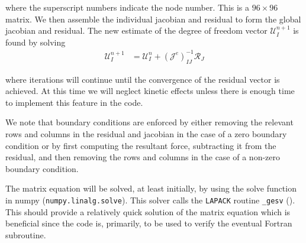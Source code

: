 where the superscript numbers indicate the node number. This is a $96 \times 96$ matrix. We then assemble the individual jacobian and residual to form the global jacobian and residual. The new estimate of the degree of freedom vector $\mathcal{U}_I^{n+1}$ is found by solving
\begin{align*}
\mathcal{U}_I^{n+1} &= \mathcal{U}_I^{n} + \left(\mathcal{J}^{e}\right)_{IJ}^{-1}\mathcal{R}_J
\end{align*}

where iterations will continue until the convergence of the residual vector is achieved. At this time we will neglect kinetic effects unless there is enough time to implement this feature in the code.

We note that boundary conditions are enforced by either removing the relevant rows and columns in the residual and jacobian in the case of a zero boundary condition or by first computing the resultant force, subtracting it from the residual, and then removing the rows and columns in the case of a non-zero boundary condition.

The matrix equation will be solved, at least initially, by using the solve function in numpy (\verb|numpy.linalg.solve|). This solver calls the \verb|LAPACK| routine \verb|_gesv| (\cite{bib:numpy.linalg.solve}). This should provide a relatively quick solution of the matrix equation which is beneficial since the code is, primarily, to be used to verify the eventual Fortran subroutine.

\FloatBarrier